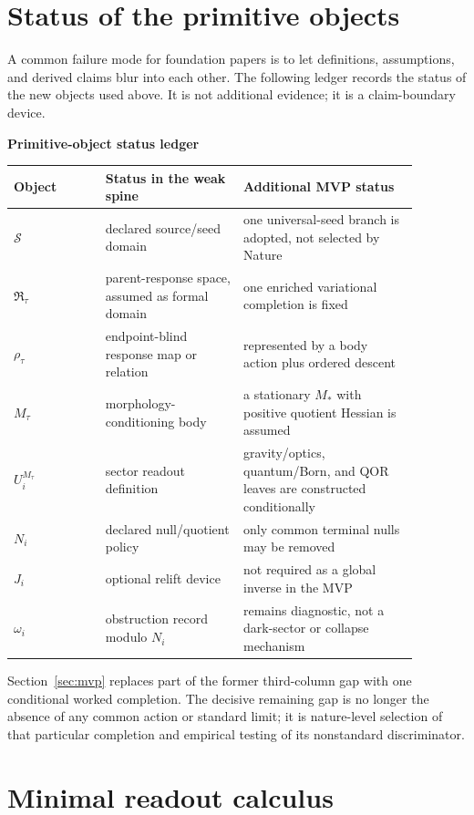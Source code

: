 \documentclass[11pt]{article}
\newcommand{\Ssrc}{\mathcal S}
\newcommand{\RTspace}{\mathfrak R_{\tau}}
\newcommand{\Rmap}{\rho_{\tau}}
\newcommand{\Mta}{M_{\tau}}
\begin{document}
\section{Status of the primitive objects}

A common failure mode for foundation papers is to let definitions, assumptions,
and derived claims blur into each other.  The following ledger records the
status of the new objects used above.  It is not additional evidence; it is a
claim-boundary device.

\begin{center}
\footnotesize
\textbf{Primitive-object status ledger}\\[0.5em]
\begin{tabular}{L{0.20\linewidth}L{0.30\linewidth}L{0.38\linewidth}}
\toprule
Object & Status in the weak spine & Additional MVP status\\
\midrule
\(\Ssrc\) & declared source/seed domain & one universal-seed branch is adopted, not selected by Nature\\
\(\RTspace\) & parent-response space, assumed as formal domain & one enriched variational completion is fixed\\
\(\Rmap\) & endpoint-blind response map or relation & represented by a body action plus ordered descent\\
\(\Mta\) & morphology-conditioning body & a stationary \(M_*\) with positive quotient Hessian is assumed\\
\(U_i^{\Mta}\) & sector readout definition & gravity/optics, quantum/Born, and QOR leaves are constructed conditionally\\
\(N_i\) & declared null/quotient policy & only common terminal nulls may be removed\\
\(J_i\) & optional relift device & not required as a global inverse in the MVP\\
\(\omega_i\) & obstruction record modulo \(N_i\) & remains diagnostic, not a dark-sector or collapse mechanism\\
\bottomrule
\end{tabular}
\end{center}

Section~\ref{sec:mvp} replaces part of the former third-column gap with one
conditional worked completion.  The decisive remaining gap is no longer the
absence of any common action or standard limit; it is nature-level selection
of that particular completion and empirical testing of its nonstandard
discriminator.

\section{Minimal readout calculus}
\end{document}
